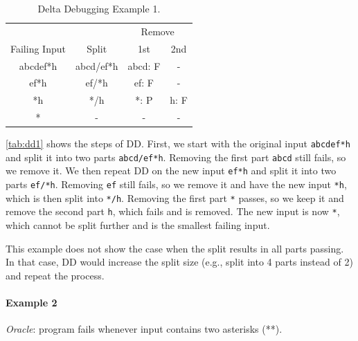 \documentclass[oneside,11pt,dvipsnames]{book}
\newcommand{\code}[1]{\texttt{#1}}
\begin{document}
\begin{table}
    \caption{Delta Debugging Example 1.}\label{tab:dd1}
    \centering
    \small
    \begin{tabular}{|c|c|c|c|}
    \toprule
    &&\multicolumn{2}{c|}{Remove} \\
    Failing Input & Split & 1st & 2nd \\
    \midrule
    abcdef*h & abcd/ef*h & abcd: F & - \\
    ef*h & ef/*h & ef: F & - \\
    *h & */h & *: P & h: F \\
    * & - & - & - \\
    \bottomrule
    \end{tabular}
\end{table}

\autoref{tab:dd1} shows the steps of DD. First, we start with the original input \code{abcdef*h} and split it into two parts \code{abcd/ef*h}. Removing the first part \code{abcd} still fails, so we remove it. We then repeat DD on the new input \code{ef*h} and split it into two parts \code{ef/*h}. Removing \code{ef} still fails, so we remove it and have the new input \code{*h}, which is then split into \code{*/h}. Removing the first part \code{*} passes, so we keep it and remove the second part \code{h}, which fails and is removed. The new input is now \code{*}, which cannot be split further and is the smallest failing input.

This example does not show the case when the split results in all parts passing. In that case, DD would increase the split size (e.g., split into 4 parts instead of 2) and repeat the process.

\paragraph{Example 2} \emph{Oracle}: program fails whenever input contains two asterisks (**).
\end{document}

